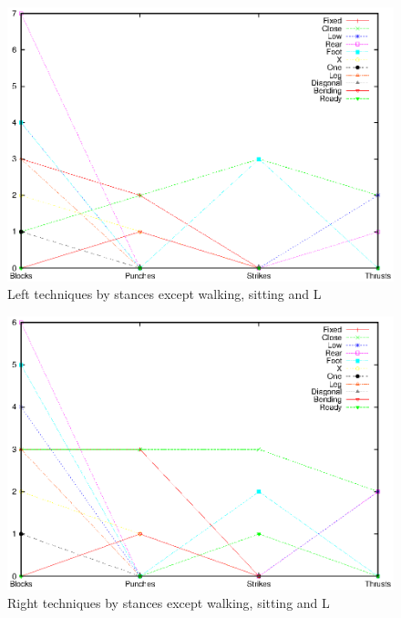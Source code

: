 \documentclass[10pt,twocolumn,a4paper]{article}
\begin{document}
  \begin{figure}
    \includegraphics[scale=0.72]{data/gnuplot/eps/stances_left_not_wsl}
    \caption{Left techniques by stances except walking, sitting and L}
    \label{fig:stances_left_not_wsl}
  \end{figure}

  \begin{figure}
    \includegraphics[scale=0.72]{data/gnuplot/eps/stances_right_not_wsl}
    \caption{Right techniques by stances except walking, sitting and L}
    \label{fig:stances_right_not_wsl}
  \end{figure}
\end{document}
